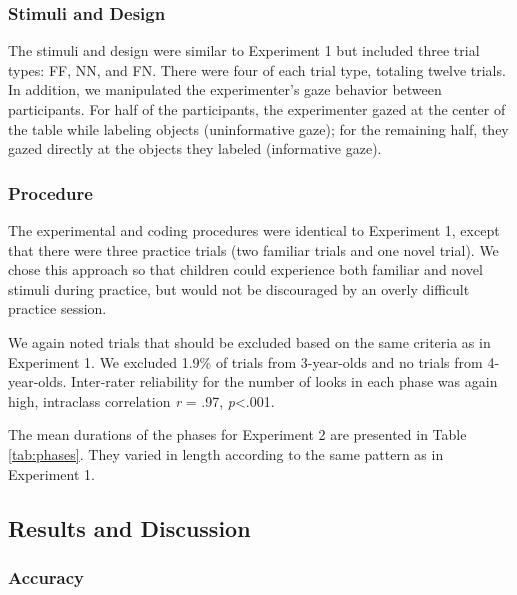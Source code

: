 \documentclass[a4paper,man,apacite,floatsintext]{apa6}
\begin{document}
\subsubsection{Stimuli and Design}\label{stimuli-and-design-1}

The stimuli and design were similar to Experiment 1 but included three
trial types: FF, NN, and FN. There were four of each trial type,
totaling twelve trials. In addition, we manipulated the experimenter's
gaze behavior between participants. For half of the participants, the
experimenter gazed at the center of the table while labeling objects
(uninformative gaze); for the remaining half, they gazed directly at the
objects they labeled (informative gaze).

\subsubsection{Procedure}\label{procedure-1}

The experimental and coding procedures were identical to Experiment 1,
except that there were three practice trials (two familiar trials and
one novel trial). We chose this approach so that children could
experience both familiar and novel stimuli during practice, but would
not be discouraged by an overly difficult practice session.

We again noted trials that should be excluded based on the same criteria
as in Experiment 1. We excluded 1.9\% of trials from 3-year-olds and no
trials from 4-year-olds. Inter-rater reliability for the number of looks
in each phase was again high, intraclass correlation \emph{r} = .97,
\emph{p}\textless{}.001.

The mean durations of the phases for Experiment 2 are presented in Table
\ref{tab:phases}. They varied in length according to the same pattern as
in Experiment 1.

\subsection{Results and Discussion}\label{results-and-discussion-1}

\subsubsection{Accuracy}\label{accuracy-1}
\end{document}

